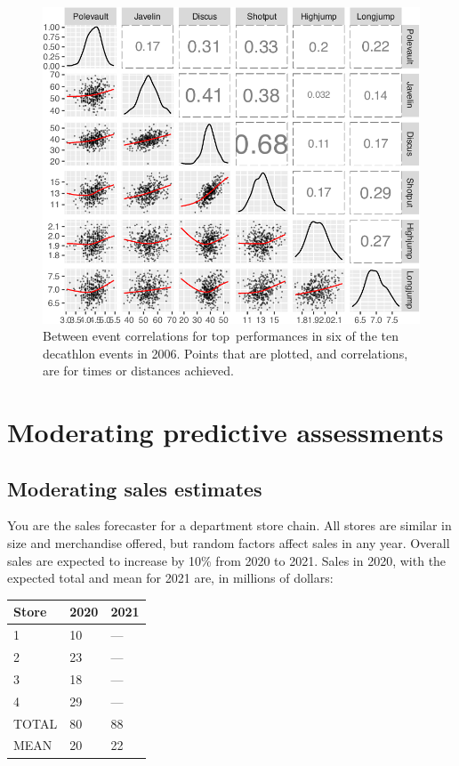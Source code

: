\documentclass[
  10pt,
  b5paper]{book}
\begin{document}
\begin{figure}[H]

{\centering \includegraphics[width=0.6\linewidth]{07-regress_files/figure-latex/selected-1} 

}

\caption{Between event correlations for top performances in six
of the ten decathlon events in 2006.  Points that are plotted,
and correlations, are for times or distances achieved.}\label{fig:selected}
\end{figure}

\hypertarget{moderating-predictive-assessments}{%
\section{Moderating predictive assessments}\label{moderating-predictive-assessments}}

\hypertarget{moderating-sales-estimates}{%
\subsection*{Moderating sales estimates}\label{moderating-sales-estimates}}

You are the sales forecaster for a department store chain.
All stores are similar in size and merchandise offered,
but random factors affect sales in any year. Overall sales
are expected to increase by 10\% from 2020 to 2021. Sales
in 2020, with the expected total and mean for 2021 are,
in millions of dollars:

\begin{longtable}[]{@{}lll@{}}
\toprule
Store & 2020 & 2021 \\
\midrule
\endhead
1 & 10 & --- \\
2 & 23 & --- \\
3 & 18 & --- \\
4 & 29 & --- \\
TOTAL & 80 & 88 \\
MEAN & 20 & 22 \\
\bottomrule
\end{longtable}
\end{document}

